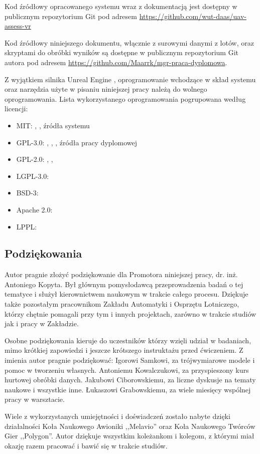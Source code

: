 Kod źródłowy opracowanego systemu wraz z dokumentacją jest dostępny w publicznym repozytorium Git pod adresem \url{https://github.com/wut-daas/uav-assess-vr}

Kod źródłowy niniejszego dokumentu, włącznie z surowymi danymi z lotów, oraz skryptami do obróbki wyników są dostępne w publicznym repozytorium Git autora pod adresem \url{https://github.com/Maarrk/mgr-praca-dyplomowa}.

Z wyjątkiem silnika Unreal Engine \cite{soft:ue4}, oprogramowanie wchodzące w skład systemu oraz narzędzia użyte w pisaniu niniejszej pracy należą do wolnego oprogramowania. Lista wykorzystanego oprogramowania pogrupowana według licencji:
\begin{itemize}
    \item MIT: \cite{soft:vuepress}, \cite{soft:vscode}, źródła systemu
    \item GPL-3.0: \cite{soft:sitl}, \cite{soft:blender}, \cite{soft:wutthesis}, źródła pracy dyplomowej
    \item GPL-2.0: \cite{soft:git}, \cite{soft:tortoisesvn}, \cite{soft:inkscape}
    \item LGPL-3.0: \cite{soft:mavlink}
    \item BSD-3: \cite{soft:pandas}
    \item Apache 2.0: \cite{soft:svn}
    \item LPPL: \cite{soft:latex}
\end{itemize}

\subsection{Podziękowania}
Autor pragnie złożyć podziękowanie dla Promotora niniejszej pracy, dr. inż. Antoniego Kopyta. Był głównym pomysłodawcą przeprowadzenia badań o tej tematyce i służył kierownictwem naukowym w trakcie całego procesu. Dziękuje także pozostałym pracownikom Zakładu Automatyki i Osprzętu Lotniczego, którzy chętnie pomagali przy tym i innych projektach, zarówno w trakcie studiów jak i pracy w Zakładzie.

Osobne podziękowania kieruje do uczestników którzy wzięli udział w badaniach, mimo krótkiej zapowiedzi i jeszcze krótszego instruktażu przed ćwiczeniem. Z imienia autor pragnie podziękować: Igorowi Samkowi, za trójwymiarowe modele i pomoc w tworzeniu własnych. Antoniemu Kowalczukowi, za przyspieszony kurs hurtowej obróbki danych. Jakubowi Ciborowskiemu, za liczne dyskusje na tematy naukowe i wszystkie inne. Łukaszowi Grabowskiemu, za wiele miesięcy wspólnej pracy w warsztacie.

Wiele z wykorzystanych umiejętności i doświadczeń zostało nabyte dzięki działalności Koła Naukowego Awioniki ,,Melavio'' oraz Koła Naukowego Twórców Gier ,,Polygon''. Autor dziękuje wszystkim koleżankom i kolegom, z którymi miał okazję razem pracować i bawić się w trakcie studiów.
